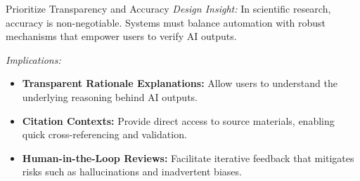 \begin{designRecom}{Prioritize Transparency and Accuracy} \textit{Design Insight:} In scientific research, accuracy is non-negotiable. Systems must balance automation with robust mechanisms that empower users to verify AI outputs.

\textit{Implications:} 
\begin{itemize} 
\item \textbf{Transparent Rationale Explanations:} Allow users to understand the underlying reasoning behind AI outputs. 
\item \textbf{Citation Contexts:} Provide direct access to source materials, enabling quick cross-referencing and validation. 
\item \textbf{Human-in-the-Loop Reviews:} Facilitate iterative feedback that mitigates risks such as hallucinations and inadvertent biases. 
\end{itemize}

\end{designRecom}
